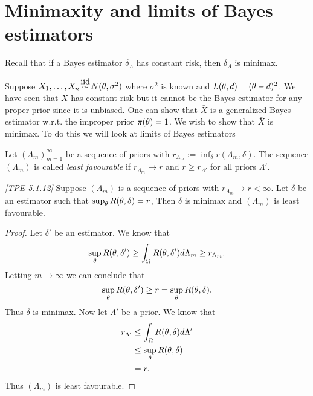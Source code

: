 \section{Minimaxity and limits of Bayes estimators}
Recall that if a Bayes estimator $\delta_\Lambda$ has constant risk, then $\delta_\Lambda$ is minimax. 
\begin{ex}
    Suppose $X_1,\ldots, X_n \iid N(\ta,\sigma^2)$ where $\sigma^2$ is known and $L({\theta},d)=({\theta}-d)^2$. We have seen that $\bar{X}$ has constant risk but it cannot be the Bayes estimator for any proper prior since it is unbiased. One can show that $\bar{X}$ is a generalized Bayes estimator w.r.t. the improper prior $\pi({\theta})=1$. We wish to show that $\bar{X}$ is minimax. To do this we will look at limits of Bayes estimators
\end{ex}
\begin{defn}
    Let $(\Lambda_m)_{m=1}^\infty$ be a sequence of priors with $r_{\Lambda_m} :=\inf_\delta r(\Lambda_m, \delta)$. The sequence $(\Lambda_m)$ is called \emph{least favourable} if $r_{\Lambda_m} \to r$ and $r \ge r_{\Lambda'}$ for all priors $\Lambda'$.
\end{defn}
\begin{thrm}
    \emph{[TPE 5.1.12]} Suppose $(\Lambda_m)$ is a sequence of priors with $r_{\Lambda_m} \to r < \infty$. Let $\delta$ be an estimator such that $\sup_{\theta} R({\theta},\delta) = r$, Then $\delta$ is minimax and $(\Lambda_m)$ is least favourable.
\end{thrm}
\begin{proof}
    Let $\delta'$ be an estimator. We know that 
    \[\sup_{\theta} R({\theta},\delta') \ge \int_{{\Omega}} R({\theta},\delta')d\Lambda_m \ge r_{\Lambda_m}. \]
    Letting $m \to \infty$ we can conclude that 
    \[\sup_{\theta} R({\theta},\delta') \ge r = \sup_{{\theta}}R({\theta},\delta). \]
    Thus $\delta$ is minimax. Now let $\Lambda'$ be a prior. We know that 
    \begin{align*}
        r_{\Lambda'}&\le \int_{{\Omega}} R({\theta},\delta)d\Lambda'\\
        &\le\sup_{\theta} R({\theta},\delta)\\
        &=r.
    \end{align*}
    Thus $(\Lambda_m)$ is least favourable.
\end{proof}
